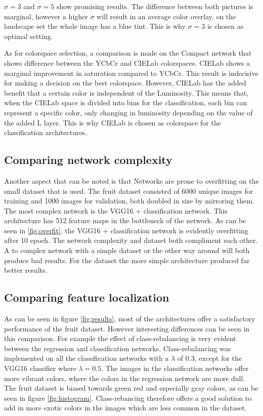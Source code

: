 $\sigma = 3$ and $\sigma = 5$ show promising results. The difference between both pictures is marginal, however a higher $\sigma$ will result in an average color overlay, on the landscape set the whole image has a blue tint. This is why $\sigma = 3$ is chosen as optimal setting.


As for colorspace selection, a comparison is made on the Compact network that shows difference between the YCbCr and CIELab colorspaces. CIELab shows a marginal improvement in saturation compared to YCbCr. This result is indecisive for making a decision on the best colorspace. However, CIELab has the added benefit that a certain color is independent of the Luminosity. This means that, when the CIELab space is divided into bins for the classification, each bin can represent a specific color, only changing in luminosity depending on the value of the added L layer. This is why CIELab is chosen as colorspace for the classification architectures.


\subsection{Comparing network complexity}
Another aspect that can be noted is that Networks are prone to overfitting on the small dataset that is used. The fruit dataset consisted of 6000 unique images for training and 1000 images for validation, both doubled in size by mirroring them. The most complex network is the VGG16 + classification network. This architecture has 512 feature maps in the bottleneck of the network. As can be seen in \ref{fig:overfit}, the VGG16 + classification network is evidently overfitting after 10 epoch. The network complexity and dataset both compliment each other. A to complex network with a simple dataset or the other way around will both produce bad results. For the dataset the more simple architecture produced far better results.

\subsection{Comparing feature localization}
As can be seen in figure \ref{fig:results}, most of the architectures offer a satisfactory performance of the fruit dataset. However interesting differences can be seen in this comparison. For example the effect of class-rebalancing is very evident between the regression and classification networks. Class-rebalancing was implemented on all the classification networks with a $\lambda$ of 0.3, except for the VGG16 classifier where $\lambda = 0.5$. The images in the classification networks offer more vibrant colors, where the colors in the regression network are more dull. The fruit dataset is biased towards green red and especially gray colors, as can be seen in figure \ref{fig:histogram}. Class-rebancing therefore offers a good solution to add in more exotic colors in the images which are less common in the dataset.

